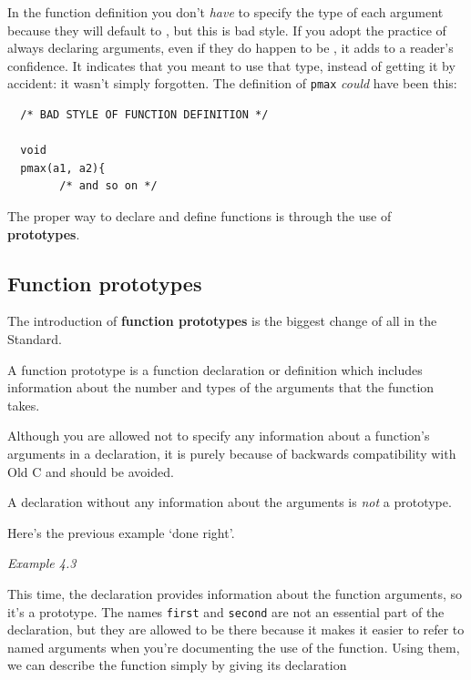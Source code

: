    In the function definition you don't \textit{have} to specify the type
    of each argument because they will default to \kint, but this
    is bad style. If you adopt the practice of always declaring arguments,
    even if they do happen to be \kint, it adds to a reader's
    confidence. It indicates that you meant to use that type, instead of
    getting it by accident: it wasn't simply forgotten. The definition of
    \texttt{pmax} \textit{could} have been this:

\begin{Verbatim}
  /* BAD STYLE OF FUNCTION DEFINITION */

  void
  pmax(a1, a2){
        /* and so on */
\end{Verbatim}

   The proper way to declare and define functions is through the use of
    \textbf{prototypes}.


  

  \subsection{Function prototypes}
   

   The introduction of \textbf{function prototypes} is the biggest
    change of all in the Standard.


   A function prototype is a function declaration or definition which
    includes information about the number and types of the arguments that
    the function takes.


   Although you are allowed not to specify any information about a
    function's arguments in a declaration, it is purely because of backwards
    compatibility with Old C and should be avoided.


   A declaration without any information about the arguments is
    \textit{not} a prototype.


   Here's the previous example `done right'.


\begin{center}\textit{Example 4.3}\end{center}

   This time, the declaration provides information about the function
    arguments, so it's a prototype. The names \texttt{first} and
    \texttt{second} are not an essential part of the declaration, but
    they are allowed to be there because it makes it easier to refer to
    named arguments when you're documenting the use of the function. Using
    them, we can describe the function simply by giving its declaration

